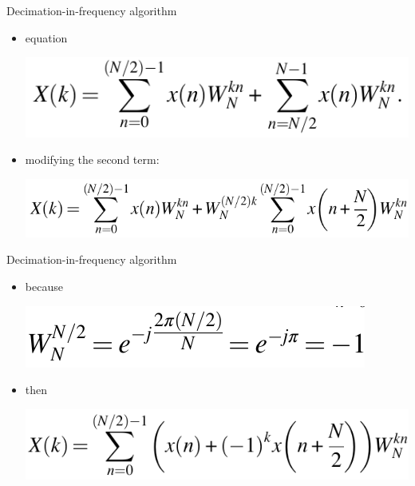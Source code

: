 \documentclass[pdflatex,compress,mathserif]{beamer}
\begin{document}
\begin{frame}{Decimation-in-frequency algorithm}
	\begin{itemize}
		\item equation
		\begin{center}
			\includegraphics[width=0.6\linewidth]{img/img05}
		\end{center}
		\item modifying the second term:
		\begin{center}
			\includegraphics[width=0.7\linewidth]{img/img06}
		\end{center}
	\end{itemize}
\end{frame}

\begin{frame}{Decimation-in-frequency algorithm}
	\begin{itemize}
		\item because
		\begin{center}
			\includegraphics[width=0.5\linewidth]{img/img07}
		\end{center}
		\item then
		\begin{center}
			\includegraphics[width=0.7\linewidth]{img/img08}
		\end{center}
	\end{itemize}
\end{frame}
\end{document}
